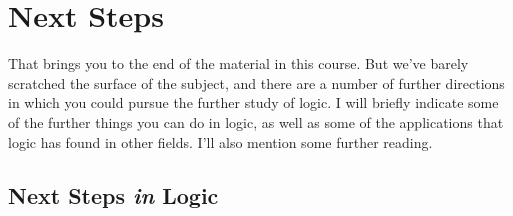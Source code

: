
\chapter{Next Steps}\label{s:nextsteps}

That brings you to the end of the material in this course. But we've barely scratched the surface of the subject, and there are a number of further directions in which you could pursue the further study of logic. I will briefly indicate some of the further things you can do in logic, as well as some of the applications that logic has found in other fields. I'll also mention some further reading.

\section{Next Steps \emph{in} Logic}

